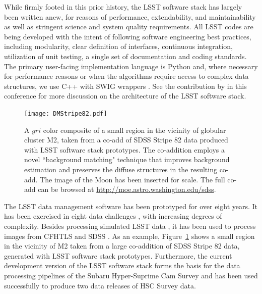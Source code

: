 \documentclass[11pt,twoside]{article}
\begin{document}
While firmly footed in this prior history, the LSST software stack has
largely been written anew, for reasons of performance, extendability, and
maintainability as well as stringent science and system quality requirements.
All LSST codes are being developed with the intent of
following software engineering best practices, including modularity, clear definition
of interfaces, continuous integration,
utilization of unit testing, a single set of documentation and coding
standards. The primary user-facing implementation language is Python and, where
necessary for performance reasons or when the algorithms require access to 
complex data structures, we use C++ with SWIG wrappers
\citep{Beazley:1996:SEU:1267498.1267513}.
See the contribution by \citet{P056_adassxxv} in this conference for
more discussion on the architecture of the LSST software stack.
\\

\begin{figure}[!t]
%
%
\texttt{[image: DMStripe82.pdf]}
\caption{
A $gri$ color composite of a small region in the vicinity of globular cluster M2, taken from a co-add of
SDSS Stripe 82 data produced with LSST software stack prototypes.  The
co-addition employs a novel ``background matching" technique
\citep{2014MNRAS.440.1296H} that improves
background estimation and preserves the diffuse structures in the resulting
co-add. The image of the Moon has been inserted for scale. The full
co-add can be browsed at \url{http://moe.astro.washington.edu/sdss}.}
\label{Fig:DMStripe82}
\end{figure}


The LSST data management software has been prototyped for over eight
years. It has been exercised in eight data challenges \citep[see e.g.][]{2010SPIE.7740E..1OK}, with increasing
degrees of complexity. Besides processing simulated LSST data
\citep{2014SPIE.9150E..14C, 0067-0049-218-1-14}, it
has been used to process images from CFHTLS
and SDSS \citep{2009ApJS..182..543A}. As an example,
Figure~\ref{Fig:DMStripe82} shows a small region in the vicinity of M2
taken from a large co-addition of SDSS Stripe 82 data, generated with LSST
software stack prototypes. Furthermore, the current development version
of the LSST software stack forms the basis for the data processing pipelines
of the Subaru Hyper-Suprime Cam Survey \citep{2012SPIE.8446E..0ZM} and
has been used successfully to produce two data releases of HSC Survey data.
\\
\end{document}
